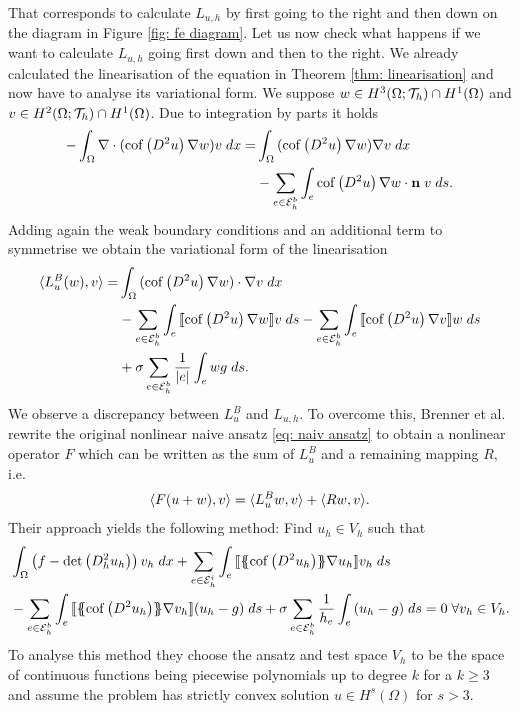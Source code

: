 That corresponds to calculate $L_{u,h}$ by first going to the right and then down on the diagram in Figure \ref{fig: fe diagram}. Let us now check what happens if we want to calculate $L_{u,h}$ going first down and then to the right.
We already calculated the linearisation of the \MA equation in Theorem \ref{thm: linearisation} and now have to analyse its variational form. We suppose $w \in H^3(\Omega; \mathcal{T}_h) \cap H^1(\Omega)$ and $v \in H^2(\Omega; \mathcal{T}_h) \cap H^1(\Omega)$. Due to integration by parts it holds
\begin{align*}
  -\int_{\Omega} {{ \nabla \cdot (\operatorname{cof} \left( D^2 u \right) \nabla w) v}\;dx}
  	=& \int_{\Omega} {{ (\operatorname{cof} \left( D^2 u \right) \nabla w) \nabla v}\;dx} \\
  	 &	- \sum_{e \in \mathcal{E}_h^b} \int_{e} {{ \operatorname{cof} \left( D^2 u \right) \nabla w \cdot \mathbf n \; v}\;ds}.
\end{align*}
Adding again the weak boundary conditions and an additional term to symmetrise we obtain the variational form of the linearisation
\begin{align}
	\langle L^B_{u}(w),v\rangle 
	    =& \int_{\Omega} {{(\operatorname{cof} \left( D^2 u \right) \nabla w) \cdot \nabla v}\;dx} \nonumber \\
	    	&- \sum_{e \in \mathcal{E}_h^b} \int_{e} {{ \llbracket  \operatorname{cof} \left( D^2 u \right) \nabla w \rrbracket v}\;ds} 
	    	- \sum_{e \in \mathcal{E}_h^b} \int_{e} {{ \llbracket \operatorname{cof} \left( D^2 u \right) \nabla v \rrbracket w}\;ds} \nonumber \\
	    	& + \sigma \sum_{e \in \mathcal{E}_h^b} \frac 1 {|e|} \int_{e} {{{w}{g}}\;ds}. \label{eq: var of linearisation}
\end{align}
We observe a discrepancy between $L^B_{u}$ and $L_{u,h}$. To overcome this, Brenner et al. rewrite the original nonlinear naive ansatz \eqref{eq: naiv ansatz} to obtain a nonlinear operator $F$ which can be written as the sum of $L^B_{u}$ and a remaining mapping $R$, i.e.
\begin{align}
	 \langle F (u+w), v \rangle =  \langle L^B_{u}w, v \rangle +  \langle Rw, v \rangle. \label{eq: brenner entwicklung}
\end{align}
Their approach yields the following method: Find $u_h \in V_h$ such that
\begin{align}
\begin{split}
	&\myIntX {\Omega} {\left(f-\mydet {D^2_h u_h}\right) v_h} 
	+ \sum_{e \in \edgesi} \myIntS e { \jump{ \average{\mycof{D^2 u_h} } \nabla u_h } v_h} \\
	&- \sum_{e \in \edgesb} \myIntS e { \jump{ \average{\mycof{D^2 u_h} } \nabla v_h } (u_h -g)} 
	+ \sigma  \sum_{e \in \edgesb} \frac 1 {h_e} \myIntS e { (u_h -g)}  = 0 \; \forall v_h \in V_h. \label{eq: brenner method}
\end{split}
\end{align}
To analyse this method they choose the ansatz and test space $V_h$ to be the space of continuous functions being piecewise polynomials up to degree $k$ for a $k \geq 3$ and assume the \MA problem has strictly convex solution $u\in H^s(\Omega)$ for $s>3$. %

